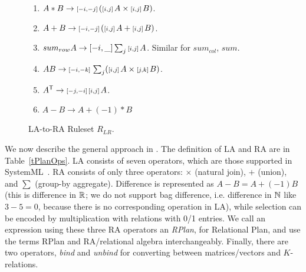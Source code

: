 \begin{figure}
\begin{enumerate}
\itemsep0em
  \item $A*B \rightarrow {\ensuremath{\scriptstyle\left[-i,-j\right]\,}}({\scriptstyle\left[i,j\right]\,}A \times {\ensuremath{\scriptstyle\left[i,j\right]\,}}B)$.
  \item $A+B \rightarrow {\ensuremath{\scriptstyle\left[-i,-j\right]\,}}({\scriptstyle\left[i,j\right]\,}A + {\scriptstyle\left[i,j\right]\,}B)$.
  \item $sum_{row} A \rightarrow [-i,\_ ] \sum_j {\scriptstyle\left[i,j\right]\,} A$. Similar for
    $sum_{col}$, $sum$.
  \item $AB \rightarrow {\ensuremath{\scriptstyle\left[-i,-k\right]\,}} \sum_j ({\scriptstyle\left[i,j\right]\,}A \times {\ensuremath{\scriptstyle\left[j,k\right]\,}}B)$.
  \item $A^{\mathsf{T}} \rightarrow {\ensuremath{\scriptstyle\left[-j,-i\right]\,}} {\ensuremath{\scriptstyle\left[i,j\right]\,}}A$.
  \item $A - B \rightarrow A + (-1) * B$
\end{enumerate}
\caption{LA-to-RA Ruleset $R_{LR}$.}
\vspace*{3pt}
\label{RMR}
\end{figure}


We now describe the general approach in \sys.  The definition
of LA and RA are in Table~\ref{tPlanOps}.  LA consists of seven
operators, which are those supported in
SystemML~\cite{DBLP:reference/bdt/Boehm19}.  RA consists of only three
operators: $\times$ (natural join), $+$ (union), and $\sum$ (group-by
aggregate).  Difference is represented as $A-B = A + (-1)B$ (this is
difference in $\mathbb R$; we do not support bag difference, i.e.  difference
in $\mathbb N$ like $3-5=0$, because there is no corresponding operation in
LA), while selection can be encoded by multiplication with relations
with 0/1 entries.  We call an expression using these three RA
operators an {\em RPlan}, for Relational Plan, and use the terms RPlan
and RA/relational algebra interchangeably.  Finally, there are two
operators, {\em bind} and {\em unbind} for converting between
matrices/vectors and $K$-relations.


